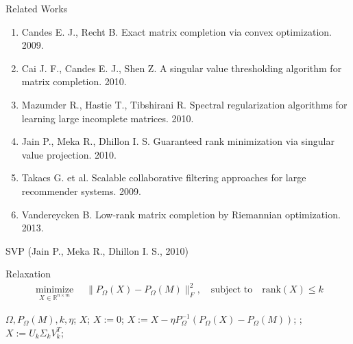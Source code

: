 \documentclass{beamer}
\begin{document}
\begin{frame}{Related Works}
\begin{enumerate}
	\item Candes E. J., Recht B. Exact matrix completion via convex optimization. 2009.
	\item Cai J. F., Candes E. J., Shen Z. A singular value thresholding algorithm for matrix completion. 2010.
	\item Mazumder R., Hastie T., Tibshirani R. Spectral regularization algorithms for learning large incomplete matrices. 2010.
	\item Jain P., Meka R., Dhillon I. S. Guaranteed rank minimization via singular value projection. 2010.
	\item Takacs G. et al. Scalable collaborative filtering approaches for large recommender systems. 2009.
	\item Vandereycken B. Low-rank matrix completion by Riemannian optimization. 2013.
\end{enumerate}
\end{frame}
\begin{frame}{SVP (Jain P., Meka R., Dhillon I. S., 2010)}

	\begin{block}{Relaxation}
		\vspace{-0.5cm}
		\begin{align*}
		\mathop{\text{minimize}}\limits_{X \in \mathbb{R}^{n \times m}} \quad 
		\| P_{\Omega} (X) - P_{\Omega} (M) \|_F^2, \quad
		\text{subject to} \quad \text{rank} (X) \leq k
		\end{align*}
	\end{block}
\vspace{0.3cm}
\begin{algorithmic}[1] 
	\REQUIRE $\Omega, P_\Omega(M), k, \eta$; 
	\ENSURE $X$;
	\STATE $X:= 0$;
	\REPEAT
	\STATE $X := X - \eta P_{\Omega}^{-1}\left(P_{\Omega}(X) - P_{\Omega}(M)\right)$;
	;
	\STATE $X := U_k \Sigma_k V_k^T$;
\end{algorithmic}
\end{frame}
\end{document}
